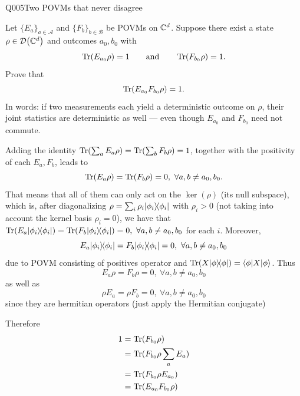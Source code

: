 \begin{entry}{Q005}{Two POVMs that never disagree}


\begin{problem}
Let $\{E_a\}_{a\in\mathcal A}$ and $\{F_b\}_{b\in\mathcal B}$ be POVMs on $\mathbb{C}^d$.
Suppose there exist a state $\rho\in\mathcal{D}\!\left(\mathbb{C}^d\right)$ and outcomes $a_0,b_0$ with
\[
  \operatorname{Tr}(E_{a_0}\rho)=1
  \qquad\text{and}\qquad
  \operatorname{Tr}(F_{b_0}\rho)=1 .
\]
Prove that
\[
  \operatorname{Tr}(E_{a_0}F_{b_0}\rho)=1 .
\]
In words: if two measurements each yield a deterministic outcome on $\rho$, their joint
statistics are deterministic as well --- even though $E_{a_0}$ and $F_{b_0}$ need not
commute.
\end{problem}


\begin{solution}
Adding the identity $\operatorname{Tr}(\sum_a E_a \rho)=\operatorname{Tr}(\sum_b F_b \rho)=1$, together with the positivity of each $E_a,F_b$, leads to $$\Tr(E_a\rho)=\Tr(F_b\rho)=0,\ \forall a,b\neq a_0,b_0.$$ That means that all of them can only act on the $\ker(\rho)$ (its null subspace), which is, after diagonalizing $\rho= \sum_i \rho_i \lvert \phi_i \rangle\!\langle \phi_i \rvert$ with $\rho_i>0$ (not taking into account the kernel basis $\rho_i=0$), we have that $\Tr(E_a\proj{\phi_i})=\Tr(F_b\proj{\phi_i})=0,\ \forall a,b\neq a_0,b_0$ for each $i$. Moreover,
$$E_a\lvert \phi_i \rangle\!\langle \phi_i \rvert=F_b\lvert \phi_i \rangle\!\langle \phi_i \rvert=0,\ \forall a,b\neq a_0,b_0$$
due to POVM consisting of positives operator and $\operatorname{Tr}(X\lvert \phi \rangle\!\langle \phi \rvert)=\langle \phi \rvert X\lvert \phi \rangle$. Thus
$$E_a\rho=F_b\rho=0,\ \forall a,b\neq a_0,b_0$$ as well as 
$$\rho E_a=\rho F_b=0,\ \forall a,b\neq a_0,b_0$$
since they are hermitian operators (just apply the Hermitian conjugate)

Therefore
\begin{equation}
\begin{split}
     1&= \operatorname{Tr}(F_{b_0}\rho)\\
     &= \operatorname{Tr}(F_{b_0}\rho\sum_aE_a)\\
     &= \operatorname{Tr}(F_{b_0}\rho E_{a_0})\\
     &= \operatorname{Tr}(E_{a_0}F_{b_0}\rho )
\end{split}
\end{equation}
\end{solution}

\begin{takeaway}

\end{takeaway}


\end{entry}

